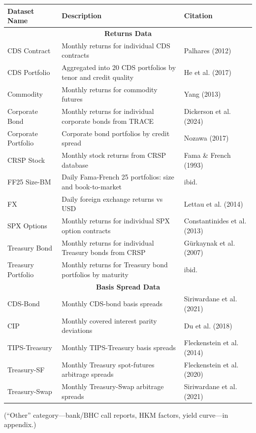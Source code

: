 \documentclass[ignorenonframetext, 9pt]{beamer}
\begin{document}
\begin{frame}[plain]
  \tiny
  \begin{table}
  \centering
  \begin{tabular}{p{2.5cm}p{5cm}p{2.5cm}}
  \toprule
  Dataset Name & Description & Citation \\
  \midrule
  \multicolumn{3}{c}{\textbf{Returns Data}} \\
  \midrule
  CDS Contract & Monthly returns for individual CDS contracts & Palhares (2012) \\
  CDS Portfolio & Aggregated into 20 CDS portfolios by tenor and credit quality & He et al. (2017) \\
  Commodity & Monthly returns for commodity futures & Yang (2013) \\
  Corporate Bond & Monthly returns for individual corporate bonds from TRACE & Dickerson et al. (2024) \\
  Corporate Portfolio & Corporate bond portfolios by credit spread & Nozawa (2017) \\
  CRSP Stock & Monthly stock returns from CRSP database & Fama \& French (1993) \\
  FF25 Size-BM & Daily Fama-French 25 portfolios: size and book-to-market & ibid. \\
  FX & Daily foreign exchange returns vs USD & Lettau et al. (2014) \\
  SPX Options & Monthly returns for individual SPX option contracts & Constantinides et al. (2013) \\
  Treasury Bond & Monthly returns for individual Treasury bonds from CRSP & Gürkaynak et al. (2007) \\
  Treasury Portfolio & Monthly returns for Treasury bond portfolios by maturity & ibid. \\
  \midrule
  \multicolumn{3}{c}{\textbf{Basis Spread Data}} \\
  \midrule
  CDS-Bond & Monthly CDS-bond basis spreads & Siriwardane et al. (2021) \\
  CIP & Monthly covered interest parity deviations & Du et al. (2018) \\
  TIPS-Treasury & Monthly TIPS-Treasury basis spreads & Fleckenstein et al. (2014) \\
  Treasury-SF & Monthly Treasury spot-futures arbitrage spreads & Fleckenstein et al. (2020) \\
  Treasury-Swap & Monthly Treasury-Swap arbitrage spreads & Siriwardane et al. (2021) \\
  \bottomrule
  \end{tabular}
  \end{table}
  \centering\scriptsize (``Other'' category---bank/BHC call reports, HKM factors, yield curve---in appendix.)
\end{frame}
\end{document}
